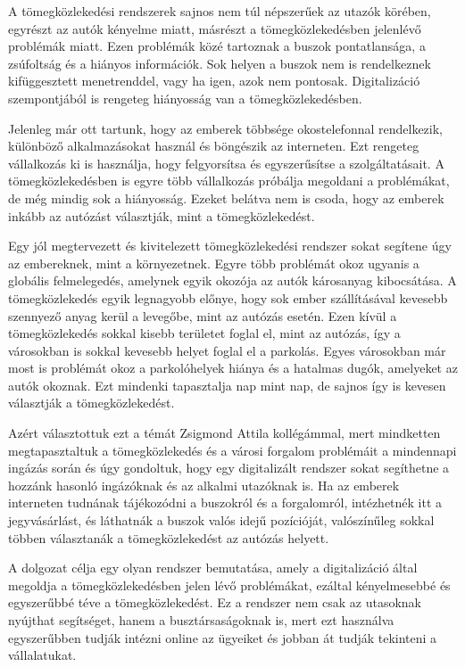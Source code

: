 A tömegközlekedési rendszerek sajnos nem túl népszerűek az utazók körében, egyrészt az autók kényelme miatt, másrészt a tömegközlekedésben jelenlévő problémák miatt. Ezen problémák közé tartoznak a buszok pontatlansága, a zsúfoltság és a hiányos információk. Sok helyen a buszok nem is rendelkeznek kifüggesztett menetrenddel, vagy ha igen, azok nem pontosak. Digitalizáció szempontjából is rengeteg hiányosság van a tömegközlekedésben.

Jelenleg már ott tartunk, hogy az emberek többsége okostelefonnal rendelkezik, különböző alkalmazásokat használ és böngészik az interneten. Ezt rengeteg vállalkozás ki is használja, hogy felgyorsítsa és egyszerűsítse a szolgáltatásait. A tömegközlekedésben is egyre több vállalkozás próbálja megoldani a problémákat, de még mindig sok a hiányosság. Ezeket belátva nem is csoda, hogy az emberek inkább az autózást választják, mint a tömegközlekedést.

Egy jól megtervezett és kivitelezett tömegközlekedési rendszer sokat segítene úgy az embereknek, mint a környezetnek. Egyre több problémát okoz ugyanis a globális felmelegedés, amelynek egyik okozója az autók károsanyag kibocsátása. A tömegközlekedés egyik legnagyobb előnye, hogy sok ember szállításával kevesebb szennyező anyag kerül a levegőbe, mint az autózás esetén. Ezen kívül a tömegközlekedés sokkal kisebb területet foglal el, mint az autózás, így a városokban is sokkal kevesebb helyet foglal el a parkolás. Egyes városokban már most is problémát okoz a parkolóhelyek hiánya és a hatalmas dugók, amelyeket az autók okoznak. Ezt mindenki tapasztalja nap mint nap, de sajnos így is kevesen választják a tömegközlekedést.

Azért választottuk ezt a témát Zsigmond Attila kollégámmal, mert mindketten megtapasztaltuk a tömegközlekedés és a városi forgalom problémáit a mindennapi ingázás során és úgy gondoltuk, hogy egy digitalizált rendszer sokat segíthetne a hozzánk hasonló ingázóknak és az alkalmi utazóknak is. Ha az emberek interneten tudnának tájékozódni a buszokról és a forgalomról, intézhetnék itt a jegyvásárlást, és láthatnák a buszok valós idejű pozícióját, valószínűleg sokkal többen választanák a tömegközlekedést az autózás helyett.

A dolgozat célja egy olyan rendszer bemutatása, amely a digitalizáció által megoldja a tömegközlekedésben jelen lévő problémákat, ezáltal kényelmesebbé és egyszerűbbé téve a tömegközlekedést. Ez a rendszer nem csak az utasoknak nyújthat segítséget, hanem a busztársaságoknak is, mert ezt használva egyszerűbben tudják intézni online az ügyeiket és jobban át tudják tekinteni a vállalatukat.

